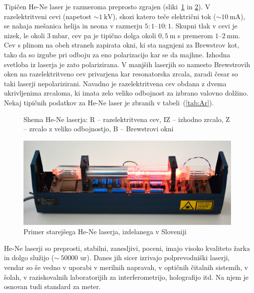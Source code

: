 Tipičen He-Ne laser je razmeroma preprosto zgrajen (sliki~\ref{fig:HeNeShema}
in \ref{fig:Iskra}).
V razelektritveni cevi (napetost  $\sim 1~\si{\kilo\volt}$), skozi
katero teče električni tok ($\sim 10~\si{\milli\ampere}$), 
se nahaja mešanica helija in neona v razmerju 
$5:1$--$10:1$. Skupni tlak v cevi je nizek, le okoli $3~\si{\milli\bar}$, 
cev pa je tipično dolga okoli $0,5~\si{\metre}$ s premerom $1$--$2~\si{\milli\metre}$.  
Cev s plinom na obeh straneh zapirata okni, ki sta nagnjeni za Brewstrov kot, 
tako da so izgube pri odboju za eno polarizacijo kar se da majhne.
Izhodna svetloba iz laserja je zato polarizirana. V manjših laserjih
so namesto Brewstrovih oken na razelektritveno cev privarjena kar
resonatorska zrcala, zaradi česar so taki laserji nepolarizirani. 
Navadno je razelektritvena cev obdana z dvema ukrivljenima zrcaloma, 
ki imata zelo veliko odbojnost za izbrano valovno dolžino.
Nekaj tipičnih podatkov za He-Ne laser je zbranih v tabeli~(\ref{tab:Ar}).
\begin{figure}[h]
\centering
\def\svgwidth{100truemm} 

\caption{Shema He-Ne laserja: R -- razelektritvena cev, IZ -- izhodno zrcalo, Z -- zrcalo
z veliko odbojnostjo, B -- Brewstrovi okni}
\label{fig:HeNeShema}
\end{figure}

\begin{figure}[h]
\centering
\includegraphics[width=120truemm]{slike/07_HeNe.jpg}
\caption{Primer starejšega He-Ne laserja, izdelanega v Sloveniji}
\label{fig:Iskra}
\end{figure}

He-Ne laserji so preprosti, stabilni, zanesljivi, poceni, imajo visoko kvaliteto žarka
in dolgo služijo ($\sim~50 000$ ur).
Danes jih sicer izrivajo polprevodniški laserji, vendar so še vedno v uporabi
v merilnih napravah, v optičnih čitalnih sistemih, v šolah, v raziskovalnih 
laboratorijih za interferometrijo, holografijo itd. Na njem je osnovan tudi 
standard za meter.

